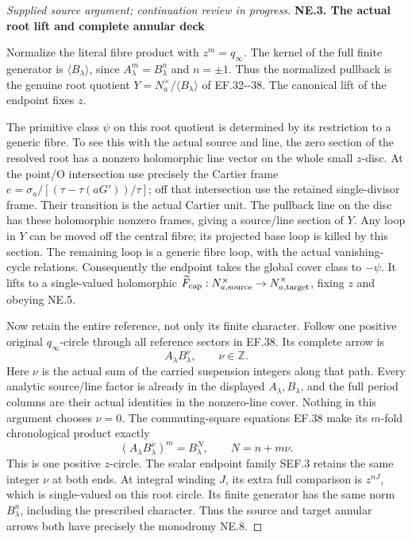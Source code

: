 \begin{proof}[Supplied source argument; continuation review in progress]
\par

\medskip\noindent\textbf{NE.3. The actual root lift and complete annular deck}

\par\nobreak

Normalize the literal fibre product with \(z^m=q_\infty\). The
kernel of the full finite generator is \(\langle B_\lambda\rangle\),
since \(A_\lambda^m=B_\lambda^n\) and \(n=\pm1\). Thus the
normalized pullback is the genuine root quotient
\(Y=N_a^\times/\langle B_\lambda\rangle\) of EF.32-\/-38. The
canonical lift of the endpoint fixes \(z\).

The primitive class \(\psi\) on this root quotient is determined
by its restriction to a generic fibre. To see this with the actual
source and line, the zero section of the resolved root has a
nonzero holomorphic line vector on the whole small \(z\)-disc.
At the point/O intersection use precisely the Cartier frame
\(e=\sigma_a/[(\tau-\tau(aG'))/\tau]\); off that intersection
use the retained single-divisor frame. Their transition is the
actual Cartier unit. The pullback line on the disc has these
holomorphic nonzero frames, giving a source/line section of \(Y\).
Any loop in \(Y\) can be moved off the central fibre; its projected
base loop is killed by this section. The remaining loop is a
generic fibre loop, with the actual vanishing-cycle relations.
Consequently the endpoint takes the global cover class to
\(-\psi\). It lifts to a single-valued holomorphic
\(\widetilde F_{\rm cap}:N_{a,\rm source}^\times\to
N_{a,\rm target}^\times\), fixing \(z\) and obeying NE.5.

Now retain the entire reference, not only its finite character.
Follow one positive original \(q_\infty\)-circle through all
reference sectors in EF.38. Its complete arrow is
\[
                     A_\lambda B_\lambda^\nu,
                     \qquad \nu\in\mathbb Z.
 \tag{NE.7}
\]
Here \(\nu\) is the actual sum of the carried suspension integers
along that path. Every analytic source/line factor is already in
the displayed \(A_\lambda,B_\lambda\), and the full period columns
are their actual identities in the nonzero-line cover. Nothing in
this argument chooses \(\nu=0\). The commuting-square equations
EF.38 make its \(m\)-fold chronological product exactly
\[
 (A_\lambda B_\lambda^\nu)^m
       =B_\lambda^{N},\qquad N=n+m\nu.
 \tag{NE.8}
\]
This is one positive \(z\)-circle. The scalar endpoint family
SEF.3 retains the same integer \(\nu\) at both ends. At integral
winding \(J\), its extra full comparison is \(z^{nJ}\), which
is single-valued on this root circle. Its finite generator has the
same norm \(B_\lambda^n\), including the prescribed character.
Thus the source and target annular arrows both have precisely the
monodromy NE.8.


\end{proof}

